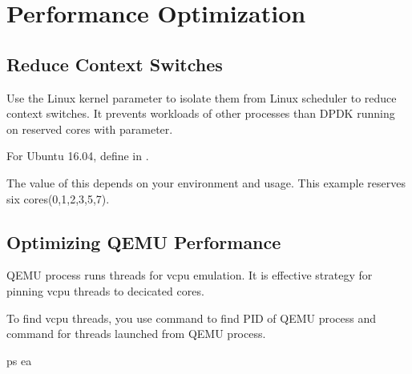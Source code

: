 \documentclass[a4paper,11pt,openany,oneside,english]{sphinxmanual}
\begin{document}
\section{Performance Optimization}
\label{\detokenize{gsg/performance_opt:performance-optimization}}\label{\detokenize{gsg/performance_opt:gsg-performance-opt}}\label{\detokenize{gsg/performance_opt::doc}}

\subsection{Reduce Context Switches}
\label{\detokenize{gsg/performance_opt:reduce-context-switches}}
Use the  Linux kernel parameter to isolate them
from Linux scheduler to reduce context switches.
It prevents workloads of other processes than DPDK running on
reserved cores with  parameter.

For Ubuntu 16.04, define  in .

\begin{sphinxVerbatim}[commandchars=\\\{\},formatcom=\footnotesize]
\end{sphinxVerbatim}

The value of this  depends on your environment and usage.
This example reserves six cores(0,1,2,3,5,7).


\subsection{Optimizing QEMU Performance}
\label{\detokenize{gsg/performance_opt:optimizing-qemu-performance}}
QEMU process runs threads for vcpu emulation. It is effective strategy
for pinning vcpu threads to decicated cores.

To find vcpu threads, you use  command to find PID of QEMU process
and  command for threads launched from QEMU process.

\begin{sphinxVerbatim}[commandchars=\\\{\},formatcom=\footnotesize]
 ps ea
\end{sphinxVerbatim}
\end{document}
